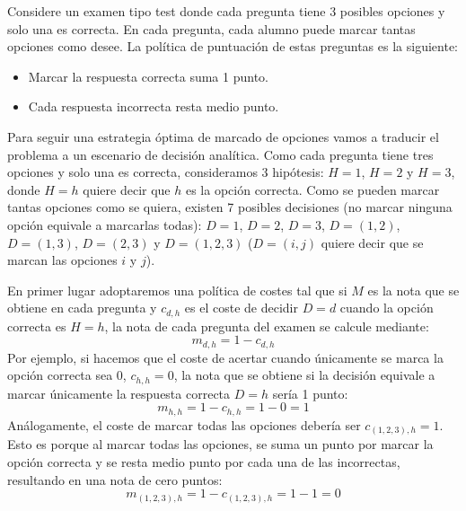 \question


\ifspanish


Considere un examen tipo test donde cada pregunta tiene 3 posibles opciones y solo una es correcta. En cada pregunta, cada alumno puede marcar tantas opciones como desee. La política de puntuación de estas preguntas es la siguiente:
\begin{itemize}
\item Marcar la respuesta correcta suma 1 punto.
\item Cada respuesta incorrecta resta medio punto.
\end{itemize}

Para seguir una estrategia óptima de marcado de opciones vamos a traducir el problema a un escenario de decisión analítica. Como cada pregunta tiene tres opciones y solo una es correcta, consideramos 3 hipótesis: $H=1$, $H=2$ y $H=3$, donde $H=h$ quiere decir que $h$ es la opción correcta. Como se pueden marcar tantas opciones como se quiera, existen 7 posibles decisiones (no marcar ninguna opción equivale a marcarlas todas): $D=1$, $D=2$, $D=3$, $D=(1,2)$, $D=(1,3)$, $D=(2,3)$ y $D=(1,2,3)$ ($D=(i,j)$ quiere decir que se marcan las opciones $i$ y $j$).

En primer lugar adoptaremos una política de costes tal que si $M$ es la nota que se obtiene en cada pregunta y $c_{d,h}$ es el coste de decidir $D=d$ cuando la opción correcta es $H=h$, la nota de cada pregunta del examen se calcule mediante:
$$
m_{d,h} = 1-c_{d,h}
$$
Por ejemplo, si hacemos que el coste de acertar cuando únicamente se marca la opción correcta sea 0, $c_{h,h}=0$, la nota que se obtiene si la decisión equivale a marcar únicamente la respuesta correcta $D=h$ sería 1 punto:
$$
m_{h,h}=1-c_{h,h} = 1-0=1
$$
Análogamente, el coste de marcar todas las opciones debería ser $c_{(1,2,3),h}=1$. Esto es porque al marcar todas las opciones, se suma un punto por marcar la opción correcta y se resta medio punto por cada una de las incorrectas, resultando en una nota de cero puntos:
$$
m_{(1,2,3),h} = 1-c_{(1,2,3),h} = 1-1=0
$$

